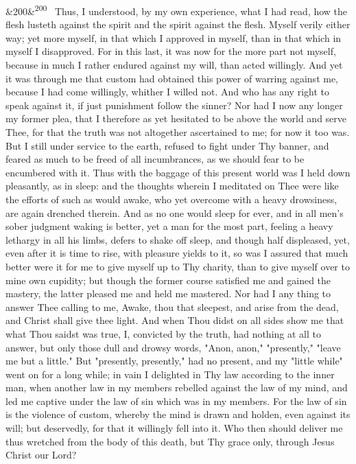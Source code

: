 \documentclass[12pt]{article}
\newcommand{\para}[1][]{\par\noindent\ifx&#1&\else\textsuperscript{\footnotesize #1}~\fi}
\begin{document}
\para[200] Thus, I understood, by my own experience, what I had read, how the flesh lusteth against the spirit and the spirit against the flesh. Myself verily either way; yet more myself, in that which I approved in myself, than in that which in myself I disapproved. For in this last, it was now for the more part not myself, because in much I rather endured against my will, than acted willingly. And yet it was through me that custom had obtained this power of warring against me, because I had come willingly, whither I willed not. And who has any right to speak against it, if just punishment follow the sinner? Nor had I now any longer my former plea, that I therefore as yet hesitated to be above the world and serve Thee, for that the truth was not altogether ascertained to me; for now it too was. But I still under service to the earth, refused to fight under Thy banner, and feared as much to be freed of all incumbrances, as we should fear to be encumbered with it. Thus with the baggage of this present world was I held down pleasantly, as in sleep: and the thoughts wherein I meditated on Thee were like the efforts of such as would awake, who yet overcome with a heavy drowsiness, are again drenched therein. And as no one would sleep for ever, and in all men's sober judgment waking is better, yet a man for the most part, feeling a heavy lethargy in all his limbs, defers to shake off sleep, and though half displeased, yet, even after it is time to rise, with pleasure yields to it, so was I assured that much better were it for me to give myself up to Thy charity, than to give myself over to mine own cupidity; but though the former course satisfied me and gained the mastery, the latter pleased me and held me mastered. Nor had I any thing to answer Thee calling to me, Awake, thou that sleepest, and arise from the dead, and Christ shall give thee light. And when Thou didst on all sides show me that what Thou saidst was true, I, convicted by the truth, had nothing at all to answer, but only those dull and drowsy words, "Anon, anon," "presently," "leave me but a little." But "presently, presently," had no present, and my "little while" went on for a long while; in vain I delighted in Thy law according to the inner man, when another law in my members rebelled against the law of my mind, and led me captive under the law of sin which was in my members. For the law of sin is the violence of custom, whereby the mind is drawn and holden, even against its will; but deservedly, for that it willingly fell into it. Who then should deliver me thus wretched from the body of this death, but Thy grace only, through Jesus Christ our Lord?
\end{document}
